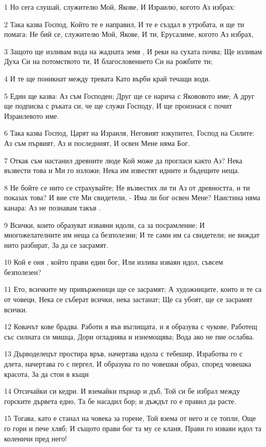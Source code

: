 \par 1 Но сега слушай, служителю Мой, Якове, И Израилю, когото Аз избрах:
\par 2 Така казва Господ, Който те е направил, И те е създал в утробата, и ще ти помага: Не бий се, служителю Мой, Якове, И ти, Ерусалиме, когото Аз избрах,
\par 3 Защото ще изливам вода на жадната земя , И реки на сухата почва; Ще изливам Духа Си на потомството ти, И благословението Си на рожбите ти;
\par 4 И те ще поникнат между тревата Като върби край течащи води.
\par 5 Един ще казва: Аз съм Господен; Друг ще се нарича с Якововото име; А друг ще подписва с ръката си, че ще служи Господу, И ще произнася с почит Израилевото име.
\par 6 Така казва Господ, Царят на Израиля, Неговият изкупител, Господ на Силите: Аз съм първият, Аз и последният, И освен Мене няма Бог.
\par 7 Откак съм настанил древните люде Кой може да прогласи както Аз? Нека възвести това и Ми го изложи; Нека им известят идните и бъдещите неща.
\par 8 Не бойте се нито се страхувайте; Не възвестих ли ти Аз от древността, и ти показах това? И вие сте Ми свидетели, - Има ли бог освен Мене? Наистина няма канара: Аз не познавам такъв .
\par 9 Всички, които образуват изваяни идоли, са за посрамление; И многожелателните им неща са безполезни; И те сами им са свидетели; не виждат нито разбират, За да се засрамят.
\par 10 Кой е оня , който прави един бог, Или излива изваян идол, съвсем безполезен?
\par 11 Ето, всичките му привърженици ще се засрамят; А художниците, които и те са от човеци, Нека се съберат всички, нека застанат; Ще са убоят, ще се засрамят всички.
\par 12 Ковачът кове брадва. Работи я във въглищата, и я образува с чукове, Работещ със силната си мишца, Дори огладнява и изнемощява; Вода ако не пие ослабва.
\par 13 Дърводелецът простира връв, начертава идола с тебешир, Изработва го с длета, начертава го с пергел, И образува го по човешки образ, според човешка красота, За да стои в къщи
\par 14 Отсичайки си кедри. И вземайки пърнар и дъб, Той си бе избрал между горските дървета едно, Та бе насадил бор; и дъждът го е правил да расте.
\par 15 Тогава, като е станал на човека за горене, Той взема от него и се топли, Още го гори и пече хляб; И същото прави бог та му се кланя, Прави го изваян идол та коленичи пред него!
